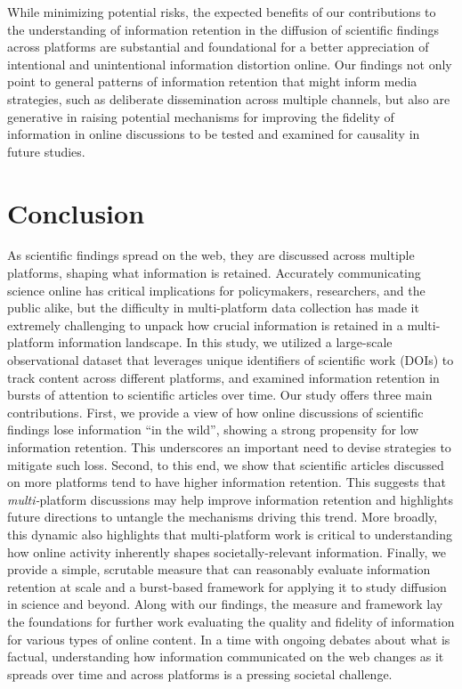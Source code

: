\documentclass[letterpaper]{article} %
\begin{document}
While minimizing potential risks, the expected benefits of our contributions to the understanding of information retention in the diffusion of scientific findings across platforms are substantial and foundational for a better appreciation of intentional and unintentional information distortion online. Our findings not only point to general patterns of information retention that might inform media strategies, such as deliberate dissemination across multiple channels, but also are generative in raising potential mechanisms for improving the fidelity of information in online discussions to be tested and examined for causality in future studies.


\vspace{-2.70mm}
\section{Conclusion}

As scientific findings spread on the web, they are discussed across multiple platforms, shaping what information is retained. Accurately communicating science online has critical implications for policymakers, researchers, and the public alike, but the difficulty in multi-platform data collection has made it extremely challenging to unpack how crucial information is retained in a multi-platform information landscape. In this study, we utilized a large-scale observational dataset that leverages unique identifiers of scientific work (DOIs) to track content across different platforms, and examined information retention in bursts of attention to scientific articles over time. Our study offers three main contributions. First, we provide a view of how online discussions of scientific findings lose information ``in the wild'', showing a strong propensity for low information retention. This underscores an important need to devise strategies to mitigate such loss. Second, to this end, we show that scientific articles discussed on more platforms tend to have higher information retention. This suggests that \textit{multi-}platform discussions may help improve information retention and highlights future directions to untangle the mechanisms driving this trend. More broadly, this dynamic also highlights that multi-platform work is critical to understanding how online activity inherently shapes societally-relevant information. Finally, we provide a simple, scrutable measure that can reasonably evaluate information retention at scale and a burst-based framework for applying it to study diffusion in science and beyond. Along with our findings, the measure and framework lay the foundations for further work evaluating the quality and fidelity of information for various types of online content. In a time with ongoing debates about what is factual, understanding how information communicated on the web changes as it spreads over time and across platforms is a pressing societal challenge.
\end{document}
